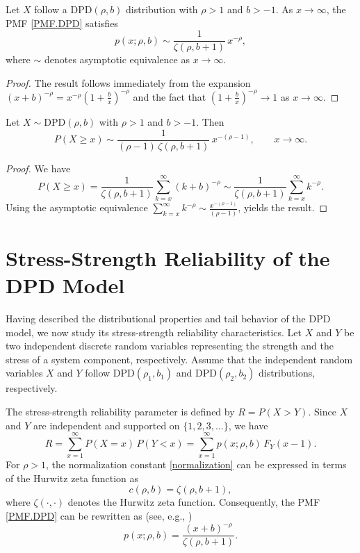 \documentclass[twoside]{article}
\begin{document}
\begin{lem} 
Let $X$ follow a $\mathrm{DPD}(\rho,b)$ distribution with $\rho>1$ and $b>-1$. As $x \to \infty$, the   PMF  \eqref{PMF.DPD} satisfies
\[ 
p(x;\rho,b) \sim \frac{1}{\zeta(\rho,b+1)}\, x^{-\rho},
\] 
where $\sim$   denotes asymptotic equivalence as $x \to \infty$.
\end{lem}

\begin{proof} 
The result follows immediately from the expansion $(x+b)^{-\rho} = x^{-\rho}(1+\frac{b}{x})^{-\rho}$ and the fact that $(1+\frac{b}{x})^{-\rho} \to 1$ as $x \to \infty$.    
\end{proof}

\begin{thm} 
Let $X \sim \mathrm{DPD}(\rho,b)$ with $\rho>1$ and $b>-1$. Then \[ P(X\ge x)\sim \frac{1}{(\rho-1)\,\zeta(\rho,b+1)}\,x^{-(\rho-1)}, \qquad x\to\infty. \] 
\end{thm} 
\begin{proof} 
We have \[ P(X\ge x) = \frac{1}{\zeta(\rho,b+1)} \sum_{k=x}^{\infty} (k+b)^{-\rho} \sim \frac{1}{\zeta(\rho,b+1)} \sum_{k=x}^{\infty} k^{-\rho}. \] 
Using the asymptotic equivalence $\sum_{k=x}^{\infty}k^{-\rho} \sim \frac{x^{-(\rho-1)}}{(\rho-1)}$,  yields the result. 
\end{proof}



\section{Stress-Strength Reliability of the DPD Model} 
Having described the distributional properties and tail behavior of the DPD model, we now study its stress-strength reliability characteristics. Let $X$ and $Y$ be two independent discrete random variables representing the strength and the stress of a system component, respectively. 
Assume that the independent random variables $X$ and $Y$ follow $\mathrm{DPD}(\rho_1, b_1)$ and $\mathrm{DPD}(\rho_2, b_2)$ distributions, respectively.

The stress-strength reliability parameter is defined by $R=P(X>Y)$.   Since $X$ and $Y$ are independent and supported on $\{1,2,3,...\}$, we have \[ R=\sum_{x=1}^{\infty}P(X=x)\,P(Y<x) =\sum_{x=1}^{\infty} p(x;\rho,b)\,F_Y(x-1). \] 
For $\rho>1$, the normalization constant \eqref{normalization} can be expressed in terms of the Hurwitz zeta function as 
\[ 
c(\rho,b)=\zeta(\rho,b+1), 
\] 
where $\zeta(\cdot,\cdot)$ denotes the Hurwitz zeta function. Consequently, the PMF \eqref{PMF.DPD} can be rewritten as (see, e.g., \cite{Kuznetsov:2001})
\[ 
p(x;\rho,b)=\frac{(x+b)^{-\rho}}{\zeta(\rho,b+1)}. 
\]
\end{document}
